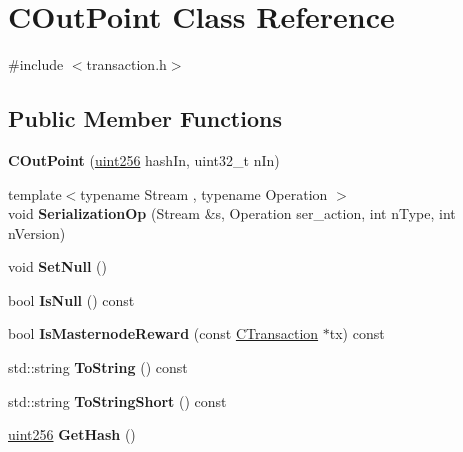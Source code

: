 \hypertarget{class_c_out_point}{}\section{C\+Out\+Point Class Reference}
\label{class_c_out_point}


{\ttfamily \#include $<$transaction.\+h$>$}

\subsection*{Public Member Functions}
\begin{DoxyCompactItemize}
\item 
\mbox{\label{class_c_out_point_a1dca427b8cabc8eefe9dc13757b6b475}} 
{\bfseries C\+Out\+Point} (\mbox{\hyperlink{classuint256}{uint256}} hash\+In, uint32\+\_\+t n\+In)
\item 
\mbox{\label{class_c_out_point_a171ccb3afa9bf9443a91e5ba3fdb911b}} 
{\footnotesize template$<$typename Stream , typename Operation $>$ }\\void {\bfseries Serialization\+Op} (Stream \&s, Operation ser\+\_\+action, int n\+Type, int n\+Version)
\item 
\mbox{\label{class_c_out_point_aa98ceceb3fc5f4d2c52033451ee8e251}} 
void {\bfseries Set\+Null} ()
\item 
\mbox{\label{class_c_out_point_ae1516581fa2234556761f04af3a207a6}} 
bool {\bfseries Is\+Null} () const
\item 
\mbox{\label{class_c_out_point_a9d3a8d27d7bec8290c14aa46e5179de4}} 
bool {\bfseries Is\+Masternode\+Reward} (const \mbox{\hyperlink{class_c_transaction}{C\+Transaction}} $\ast$tx) const
\item 
\mbox{\label{class_c_out_point_ab0026adab6a1098cf00de05c872fbb5d}} 
std\+::string {\bfseries To\+String} () const
\item 
\mbox{\label{class_c_out_point_a85f13609edc1f66afe82fb68f28fb8b7}} 
std\+::string {\bfseries To\+String\+Short} () const
\item 
\mbox{\label{class_c_out_point_ad27bc2d181d21a921e6811d24203c6bb}} 
\mbox{\hyperlink{classuint256}{uint256}} {\bfseries Get\+Hash} ()
\end{DoxyCompactItemize}
